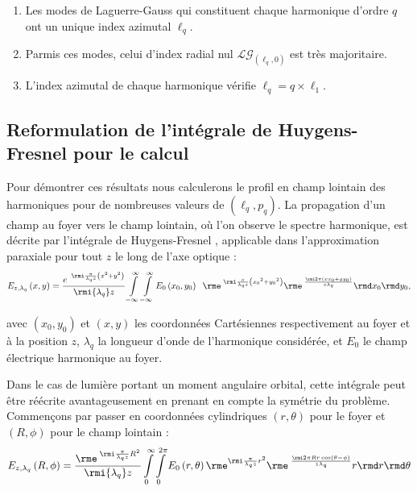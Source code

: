 \begin{enumerate}
\item Les modes de Laguerre-Gauss qui constituent chaque harmonique d'ordre $q$ ont un unique index azimutal $\ell_q$.
\item Parmis ces modes, celui d'index radial nul $\mathcal{LG}_{(\ell_q,0)}$ est très majoritaire.
\item L'index azimutal de chaque harmonique vérifie $\ell_q=q\times\ell_1$.
\label{enum:properties}
\end{enumerate}

\subsection{Reformulation de l'intégrale de Huygens-Fresnel pour le calcul}
Pour démontrer ces résultats nous calculerons le profil en champ lointain des harmoniques pour de nombreuses valeurs de $(\ell_q,p_q)$. La propagation d'un champ au foyer vers le champ lointain, où l'on observe le spectre harmonique, est décrite par l'intégrale de Huygens-Fresnel , applicable dans l'approximation paraxiale pour tout $z$ le long de l'axe optique :
	\begin{equation*}
	{E_{z,{\lambda _q}}}\left( {x,y} \right) = \frac{{{e^{\;\;\rmi\frac{{\pi }}{{{\lambda _q}z}}\left( {{x^2} + {y^2}} \right)}}}}{{\rmi{\lambda _q}z}}\int \limits_{ - \infty }^\infty \int \limits_{ - \infty }^\infty  {E_0}\left( {{x_0},{y_0}} \right)\;\;{{\rme}^{\;\rmi\frac{\pi }{{{\lambda _q}z}}\left( {{x_0}^2 + {y_0}^2} \right)}}{{\rme}^{\;\frac{{ \rmi 2{\pi}\left( {x{x_0} + y{y_0}} \right)}}{{z{\lambda _q}}}}}{\rmd}{x_0}{\rmd}{y_0},
	\end{equation*}

avec $\left( {{x_0},{y_0}} \right)$ et $\left( {x,y} \right)$ les coordonnées Cartésiennes respectivement au foyer et à la position $z$, ${\lambda _q}$ la longueur d'onde de l'harmonique considérée, et ${E_0}$ le champ électrique harmonique au foyer.

Dans le cas de lumière portant un moment angulaire orbital, cette intégrale peut être réécrite avantageusement en prenant en compte la symétrie du problème. Commençons par passer en coordonnées cylindriques $\left( {r,\theta } \right)$ pour le foyer et $\left( {R,\phi } \right)$ pour le champ lointain :
\begin{equation*}
{E_{z,{\lambda _q}}}\left( {R,\phi } \right) = \frac{{{\rme^{\;\rmi\frac{{\pi}}{{{\lambda _q}z}}{R^2}}}}}{{\rmi{\lambda _q}z}}\int \limits_0^\infty \int \limits_0^{2{\pi}} {E_0}\left( {r,\theta } \right){\rme^{\rmi\frac{{\pi}}{{{\lambda _q}z}}{r^2}}}{\rme^{\;\frac{{ \rmi 2{\pi}Rr\cos \left( {\theta  - \phi } \right)}}{{z{\lambda _q}}}}}r{\rmd}r{\rmd}\theta 
\end{equation*}

